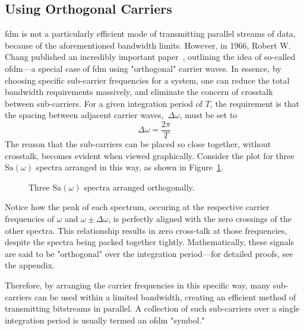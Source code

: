 \documentclass[class=report,11pt,crop=false]{standalone}
\begin{document}
\subsection{Using Orthogonal Carriers}
\gls{fdm} is not a particularly efficient mode of transmitting parallel streams of data, because of the aforementioned bandwidth limits. However, in 1966, Robert W. Chang published an incredibly important paper~\cite{Chang1966}, outlining the idea of so-called \gls{ofdm}---a special case of \gls{fdm} using "orthogonal" carrier waves. In essence, by choosing specific sub-carrier frequencies for a system, one can reduce the total bandwidth requirements massively, and eliminate the concern of crosstalk between sub-carriers. For a given integration period of \(T\), the requirement is that the spacing between adjacent carrier waves,~\(\Delta\omega\), must be set to
\begin{equation}
    \Delta \omega = \frac{2\pi}{T}
\end{equation}
The reason that the sub-carriers can be placed so close together, without crosstalk, becomes evident when viewed graphically. Consider the plot for three \(\mathrm{Sa}(\omega)\) spectra arranged in this way, as shown in Figure~\ref{fig:ofdm-three-sincs}.
\begin{figure}[htbp]
    \centering
    \captionsetup{type=figure}
    \def\svgwidth{0.8\linewidth}
    { %
        }
    \caption{Three \(\mathrm{Sa}(\omega)\) spectra arranged orthogonally.}
    \label{fig:ofdm-three-sincs}
\end{figure}
Notice how the peak of each spectrum, occuring at the respective carrier frequencies of \(\omega\) and \(\omega\pm\Delta\omega\), is perfectly aligned with the zero crossings of the other spectra. This relationship results in zero cross-talk at those frequencies, despite the spectra being packed together tightly. Mathematically, these signals are said to be "orthogonal" over the integration period---for detailed proofs, see the appendix.

Therefore, by arranging the carrier frequencies in this specific way, many sub-carriers can be used within a limited bandwidth, creating an efficient method of transmitting bitstreams in parallel. A collection of such sub-carriers over a single integration period is usually termed an \gls{ofdm} "symbol."
\end{document}
